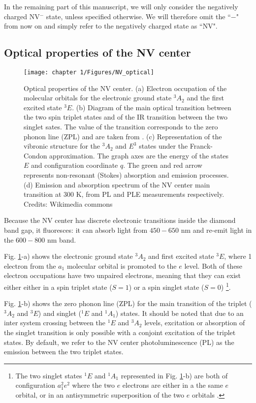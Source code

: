\documentclass[a4paper, 11pt]{report}
\begin{document}
In the remaining part of this manuscript, we will only consider the negatively charged NV$^-$ state, unless specified otherwise. We will therefore omit the ``$-$" from now on and simply refer to the negatively charged state as ``NV".
\subsection{Optical properties of the NV center}
\begin{figure}[h!]
\centering
\texttt{[image: chapter 1/Figures/NV\_optical]}
\caption{Optical properties of the NV center. (a) Electron occupation of the molecular orbitals for the electronic ground state $^3A_2$ and the first excited state $^3E$. (b) Diagram of the main optical transition between the two spin triplet states and of the IR transition between the two singlet sates. The value of the transition corresponds to the zero phonon line (ZPL) and are taken from \citep{doherty2013nitrogen}. (c) Representation of the vibronic structure for the $^3A_2$ and $E^3$ states under the Franck-Condon approximation. The graph axes are the energy of the states $E$ and configuration coordinate $q$. The green and red arrow represents non-resonant (Stokes) absorption and emission processes. (d) Emission and absorption spectrum of the NV center main transition at 300 K, from PL and PLE measurements respectively. Credits: Wikimedia commons}
\label{NV optical}
\end{figure}

Because the NV center has discrete electronic transitions inside the diamond band gap, it fluoresces: it can absorb light from $450-650$ nm and re-emit light in the $600-800$ nm band.

Fig. \ref{NV optical}-a) shows the electronic ground state $^3A_2$ and first excited state $^3E$, where 1 electron from the $a_1$ molecular orbital is promoted to the $e$ level. Both of these electron occupations have two unpaired electrons, meaning that they can exist either either in a spin triplet state ($S=1$) or a spin singlet state ($S=0$) \footnote{The two singlet states $^1E$ and $^1A_1$ represented in Fig. \ref{NV optical}-b) are both of configuration $a_1^2e^2$ where the two $e$ electrons are either in a the same $e$ orbital, or in an antisymmetric superposition of the two $e$ orbitals \citep{doherty2011negatively}.}. 

Fig. \ref{NV optical}-b) shows the zero phonon line (ZPL) for the main transition of the triplet ($^3A_2$ and $^3E$) and singlet ($^1E$ and $^1A_1$) states. It should be noted that due to an inter system crossing between the $^1E$ and $^3A_2$ levels, excitation or absorption of the singlet transition is only possible with a conjoint excitation of the triplet states. By default, we refer to the NV center photoluminescence (PL) as the emission between the two triplet states.
\end{document}
